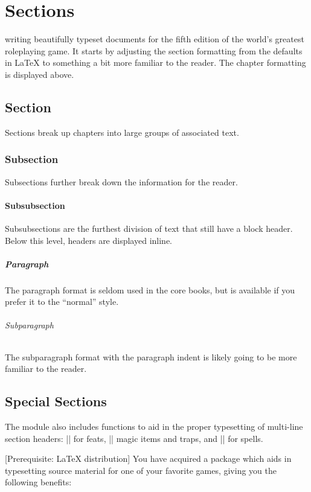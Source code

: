 \documentclass[letterpaper,twocolumn,openany,nodeprecatedcode]{dndbook}
\begin{document}
\chapter{Sections}

 writing beautifully typeset documents for the fifth edition of the world's greatest roleplaying game. It starts by adjusting the section formatting from the defaults in \LaTeX{} to something a bit more familiar to the reader. The chapter formatting is displayed above.

\section{Section}
Sections break up chapters into large groups of associated text.

\subsection{Subsection}
Subsections further break down the information for the reader.

\subsubsection{Subsubsection}
Subsubsections are the furthest division of text that still have a block header. Below this level, headers are displayed inline.

\paragraph{Paragraph}
The paragraph format is seldom used in the core books, but is available if you prefer it to the ``normal'' style.

\subparagraph{Subparagraph}
The subparagraph format with the paragraph indent is likely going to be more familiar to the reader.

\section{Special Sections}
The module also includes functions to aid in the proper typesetting of multi-line section headers: |\DndFeatHeader| for feats, |\DndItemHeader| magic items and traps, and |\DndSpellHeader| for spells.

[Prerequisite: \LaTeX{} distribution]
You have acquired a package which aids in typesetting source material for one of your favorite games, giving you the following benefits:
\end{document}

